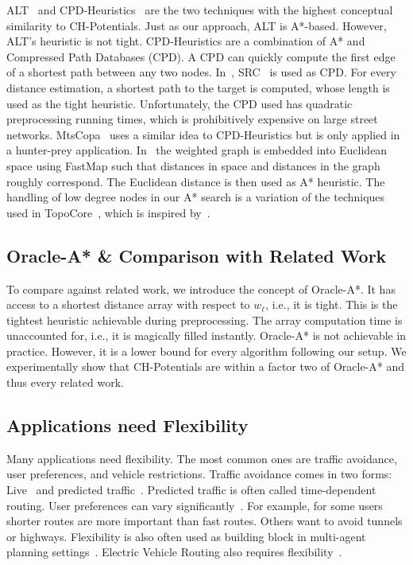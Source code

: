 \documentclass[letterpaper]{article} %
\begin{document}
ALT~\cite{gh-cspas-05} and CPD-Heuristics~\cite{DBLP:conf/ijcai/BonoGHS19} are the two techniques with the highest conceptual similarity to CH-Potentials.
Just as our approach, ALT is A*-based.
However, ALT's heuristic is not tight.
%
CPD-Heuristics are a combination of A* and Compressed Path Databases (CPD).
A CPD can quickly compute the first edge of a shortest path between any two nodes.
In~\cite{DBLP:conf/ijcai/BonoGHS19}, SRC~\cite{DBLP:conf/socs/StrasserHB14} is used as CPD.
For every distance estimation, a shortest path to the target is computed, whose length is used as the tight heuristic.
Unfortunately, the CPD used has quadratic preprocessing running times, which is prohibitively expensive on large street networks.
%
MtsCopa~\cite{DBLP:journals/tciaig/BaierBHH15} uses a similar idea to CPD-Heuristics but is only applied in a hunter-prey application.
%
In~\cite{DBLP:conf/ijcai/0002UJAKK18} the weighted graph is embedded into Euclidean space using FastMap such that distances in space and distances in the graph roughly correspond.
The Euclidean distance is then used as A* heuristic.
%
The handling of low degree nodes in our A* search is a variation of the techniques used in TopoCore~\cite{DBLP:conf/gis/DibbeltSW15}, which is inspired by~\cite{DBLP:journals/pvldb/FunkeNS14}.

\subsection{Oracle-A* \& Comparison with Related Work}

To compare against related work, we introduce the concept of Oracle-A*.
It has access to a shortest distance array with respect to $w_\ell$, i.e., it is tight.
This is the tightest heuristic achievable during preprocessing.
The array computation time is unaccounted for, i.e., it is magically filled instantly.
Oracle-A* is not achievable in practice.
However, it is a lower bound for every algorithm following our setup.
We experimentally show that CH-Potentials are within a factor two of Oracle-A* and thus every related work.

\subsection{Applications need Flexibility}

Many applications need flexibility.
The most common ones are traffic avoidance, user preferences, and vehicle restrictions.
Traffic avoidance comes in two forms: Live~\cite{dgpw-crprn-13,dsw-cch-15} and predicted traffic~\cite{ndls-bastd-12,bgsv-mtdtt-13}.
Predicted traffic is often called time-dependent routing.
%
User preferences can vary significantly~\cite{DBLP:conf/gis/FunkeS15,DBLP:conf/gis/DellingGGKTW15,DBLP:conf/gis/FunkeLS16}.
For example, for some users shorter routes are more important than fast routes.
Others want to avoid tunnels or highways.
%
Flexibility is also often used as building block in multi-agent planning settings~\cite{DBLP:journals/ai/SharonSFS15,DBLP:journals/tciaig/BaierBHH15}.
%
Electric Vehicle Routing also requires flexibility~\cite{DBLP:journals/algorithmica/BaumDPSWZ20,DBLP:conf/aaai/EisnerFS11}.
\end{document}
